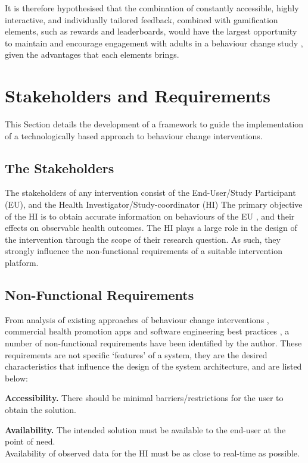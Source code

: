 It is therefore hypothesised that the combination of constantly accessible, highly interactive, and individually tailored feedback, combined with gamification elements, such as rewards and leaderboards, would have the largest opportunity to maintain and encourage engagement with adults in a behaviour change study \cite{Middelweerd2014}, given the advantages that each elements brings.
\section{Stakeholders and Requirements}
This Section details the development of a framework to guide the implementation of a technologically based approach to behaviour change interventions.

\subsection{The Stakeholders}
The stakeholders of any intervention consist of the End-User/Study Participant (EU), and the Health Investigator/Study-coordinator (HI)
The primary objective of the HI is to obtain accurate information on behaviours of the EU	, and their effects on observable health outcomes. The HI plays a large role in the design of the intervention through the scope of their research question. As such, they strongly influence the non-functional requirements of a suitable intervention platform.

\subsection{Non-Functional Requirements}
From analysis of existing approaches of behaviour change interventions \cite{Prochaska2005,Ruiter2014}, commercial health promotion apps \cite{Ozdalga2012, Higgins2016} and software engineering best practices \cite{Fielding2000, Jones2010}, a number of non-functional requirements have been identified by the author. These requirements are not specific `features' of a system, they are the desired characteristics that influence the design of the system architecture, and are listed below:

\textbf{Accessibility.}
There should be minimal barriers/restrictions for the user to obtain the solution.

\textbf{Availability.}
The intended solution must be available to the end-user at the point of need.
\\Availability of observed data for the HI must be as close to real-time as possible.

